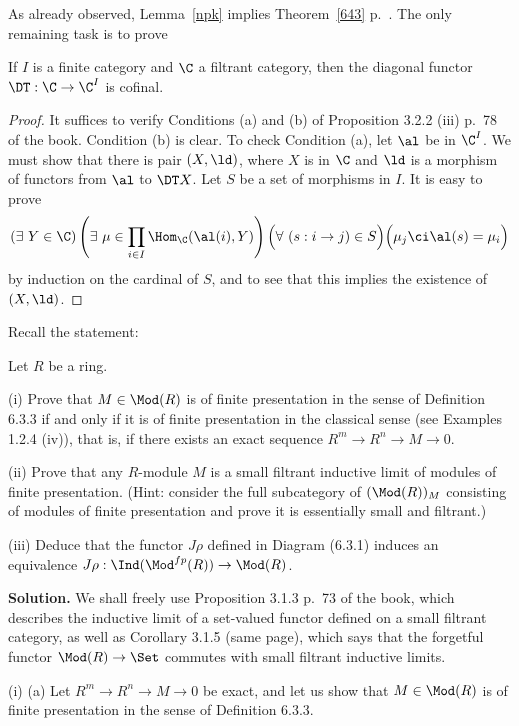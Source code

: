 \documentclass[12pt]{article}
\theoremstyle{remark}
\theoremstyle{definition}
\begin{document}
As already observed, Lemma~\ref{npk} implies Theorem~\ref{643} p.~. The only remaining task is to prove 

\begin{lem}
If $I$ is a finite category and $\C$ a filtrant category, then the diagonal functor $\DT:\C\to\C^I$ is cofinal.
\end{lem}

\begin{proof}
It suffices to verify Conditions (a) and (b) of Proposition 3.2.2 (iii) p.~78 of the book. Condition (b) is clear. To check Condition (a), let $\al$ be in $\C^I$. We must show that there is pair $(X,\ld)$, where $X$ is in $\C$ and $\ld$ is a morphism of functors from $\al$ to $\DT X$. Let $S$ be a set of morphisms in $I$. It is easy to prove 
$$
(\exists\ Y\in\C)\left(\exists\ \mu\in\prod_{i\in I}\Hom_\C(\al(i),Y)\right)\Big(\forall\ (s:i\to j)\in S\Big)\Big(\mu_{j}\ci\al(s)=\mu_i\Big) 
$$ 
by induction on the cardinal of $S$, and to see that this implies the existence of $(X,\ld)$.
\end{proof} 



Recall the statement: 

Let $R$ be a ring.

\nn(i) Prove that $M\in\Mod(R)$ is of finite presentation in the sense of Definition 6.3.3 if and only if it is of finite presentation in the classical sense (see Examples 1.2.4 (iv)), that is, if there exists an exact sequence $R^m\to R^n\to M\to0$.

\nn(ii) Prove that any $R$-module $M$ is a small filtrant inductive limit of modules of finite presentation. (Hint: consider the full subcategory of $(\Mod(R))_M$ consisting of modules of finite presentation and prove it is essentially small and filtrant.)

\nn(iii) Deduce that the functor $J\rho$ defined in Diagram (6.3.1) induces an equivalence $J\rho:\Ind(\Mod^{fp}(R))\to\Mod(R)$.

\nn\textbf{Solution.} We shall freely use Proposition 3.1.3 p.~73 of the book, which describes the inductive limit of a set-valued functor defined on a small filtrant category, as well as Corollary 3.1.5 (same page), which says that the forgetful functor $\Mod(R)\to\Set$ commutes with small filtrant inductive limits.

\nn(i) (a) Let $R^m\to R^n\to M\to0$ be exact, and let us show that $M\in\Mod(R)$ is of finite presentation in the sense of Definition 6.3.3. 
\end{document}
